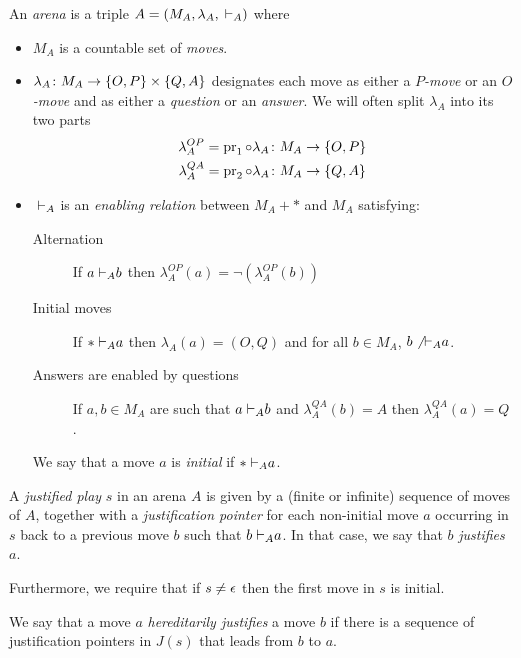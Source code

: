 \documentclass{article}
\begin{document}
\begin{definition}
  An \emph{arena} is a triple $A=(M_A,\lambda_A,{\;\vdash}_A)$ where
  \begin{itemize}
    \item $M_A$ is a countable set of \emph{moves}.
    \item $\lambda_A\colon M_A\to\{O,P\}\times\{Q,A\}$ designates each move as either a \emph{$P$-move} or an \emph{$O$-move} and as either a \emph{question} or an \emph{answer}.  
      We will often split $\lambda_A$ into its two parts
      \begin{gather}
        \lambda_A^{OP} = \operatorname{pr}_1\circ\lambda_A\colon M_A\to\{O,P\}\\
        \lambda_A^{QA} = \operatorname{pr}_2\circ\lambda_A\colon M_A\to\{Q,A\}
      \end{gather}
    \item ${\;\vdash}_A$ is an \emph{enabling relation} between $M_A+*$ and $M_A$ satisfying:
      \begin{description}
        \item[Alternation] If $a {\;\vdash}_A b$ then $\lambda_A^{OP} (a) = \neg(\lambda_A^{OP}(b))$
        \item[Initial moves] If $*{\;\vdash}_A a$ then $\lambda_A(a) = (O,Q)$ and for all $b\in M_A$, $b\not{{\;\vdash}_A} a$.
        \item[Answers are enabled by questions] If $a,b\in M_A$ are such that $a {\;\vdash}_A b$ and $\lambda_A^{QA}(b)=A$ then $\lambda_A^{QA}(a)=Q$.
      \end{description}
      We say that a move $a$ is \emph{initial} if $*{\;\vdash}_A a$.
  \end{itemize}
\end{definition}

\begin{definition}
  A \emph{justified play} $s$ in an arena $A$ is given by a (finite or infinite) sequence of moves of $A$, together with a \emph{justification pointer} for each non-initial move $a$ occurring in $s$ back to a previous move $b$ such that $b{\;\vdash}_A a$.  
  In that case, we say that $b$ \emph{justifies} $a$.
  
  Furthermore, we require that if $s\ne \epsilon$ then the first move in $s$ is initial.
\end{definition}

\begin{definition}
  We say that a move $a$ \emph{hereditarily justifies} a move $b$ if there is a sequence of justification pointers in $J(s)$ that leads from $b$ to $a$.
\end{definition}
\end{document}
